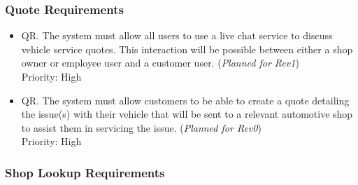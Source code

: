 \documentclass[12pt]{article}
\newcounter{workreqnum} %
\newcounter{quotereqnum} %
\newcommand{\rev}[1]{(\textit{Planned for Rev#1})}
\begin{document}
    

\subsubsection{Quote Requirements}

\begin {itemize}
    \item[QR\refstepcounter{quotereqnum}\thequotereqnum \label{R_Output}.] The system must allow all users to use a live chat service to discuss vehicle service quotes. This interaction will be possible between either a shop owner or employee user and a customer user. \rev{1} \\
    Priority: High

    
    \item[QR\refstepcounter{quotereqnum}\thequotereqnum \label{R_Output}.] The system must allow customers to be able to create a quote detailing the issue(s) with their vehicle that will be sent to a relevant automotive shop to assist them in servicing the issue. \rev{0} \\
    Priority: High

\end {itemize}

\subsubsection{Shop Lookup Requirements}
\end{document}
